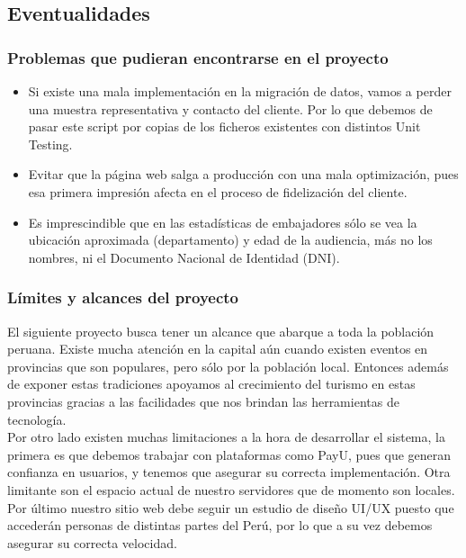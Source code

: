\subsection{Eventualidades}
\subsubsection{Problemas que pudieran encontrarse en el proyecto}
\begin{itemize}
    \item Si existe una mala implementación en la migración de datos, vamos a perder una muestra representativa y contacto del cliente. Por lo que debemos de pasar este script por copias de los ficheros existentes con distintos Unit Testing.
    \item Evitar que la página web salga a producción con una mala optimización, pues esa primera impresión afecta en el proceso de fidelización del cliente.
    \item Es imprescindible que en las estadísticas de embajadores sólo se vea la ubicación aproximada (departamento) y edad de la audiencia, más no los nombres, ni el Documento Nacional de Identidad (DNI). 
\end{itemize}

\subsubsection{Límites y alcances del proyecto}
El siguiente proyecto busca tener un alcance que abarque a toda la población peruana. Existe mucha atención en la capital aún cuando existen eventos en provincias que son populares, pero sólo por la población local. Entonces además de exponer estas tradiciones apoyamos al crecimiento del turismo en estas provincias gracias a las facilidades que nos brindan las herramientas de tecnología.\\

Por otro lado existen muchas limitaciones a la hora de desarrollar el sistema, la primera es que debemos trabajar con plataformas como PayU, pues que generan confianza en usuarios, y tenemos que asegurar su correcta implementación. Otra limitante son el espacio actual de nuestro servidores que de momento son locales. Por último nuestro sitio web debe seguir un estudio de diseño UI/UX puesto que accederán personas de distintas partes del Perú, por lo que a su vez debemos asegurar su correcta velocidad. 